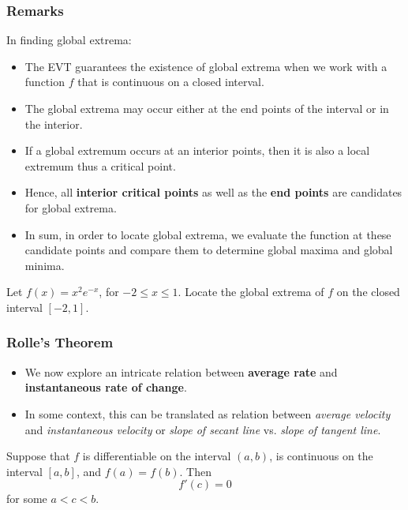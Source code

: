 \documentclass[10pt,t,handout,ignorenonframetext,aspectratio=169]{beamer}
\begin{document}
\begin{frame}
  \frametitle{Remarks}
  In finding global extrema:
  \begin{itemize}
  \item The EVT guarantees the existence of global extrema when we work with a function $f$ that is continuous on a closed interval.
  \item The global extrema may occur either at the end points of the interval or in the interior.
  \item If a global extremum occurs at an interior points, then it is also a local extremum thus a critical point.
  \item Hence, all \textbf{interior critical points} as well as the \textbf{end points} are candidates for global extrema.
  \item In sum, in order to locate global extrema, we evaluate the
    function at these candidate points and compare them to determine
    global maxima and global minima.
  \end{itemize}
\end{frame}

\begin{frame}
  \vs{}

  \question{} Let $f(x)=x^2e^{-x}$, for $ -2\le x\le1$. Locate the global
  extrema of $f$ on the closed interval $[-2,1]$.
\end{frame}


\begin{frame}
  \frametitle{Rolle's Theorem}

  \begin{itemize}
  \item We now explore an intricate relation between \textbf{average
      rate} and \textbf{instantaneous rate of change}.
  \item In some context, this can be translated as relation between
    \textit{average velocity} and \textit{instantaneous velocity} or
    \textit{slope of secant line} vs. \textit{slope of tangent line}.
  \end{itemize}

  \begin{thm}
    Suppose that $f$ is differentiable on the interval $(a,b)$, is
    continuous on the interval $[a,b]$, and $f(a)=f(b)$. Then
    \[
      f'(c)=0
    \]
    for some $a<c<b$.
  \end{thm}
\end{frame}
\end{document}
